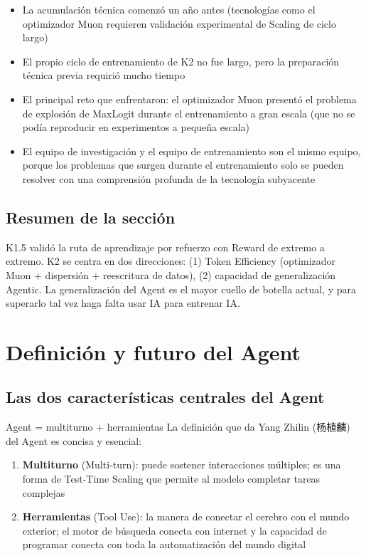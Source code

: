 \documentclass[a4paper]{article}
\begin{document}
\begin{itemize}
    \item La acumulación técnica comenzó un año antes (tecnologías como el optimizador Muon requieren validación experimental de Scaling de ciclo largo)
    \item El propio ciclo de entrenamiento de K2 no fue largo, pero la preparación técnica previa requirió mucho tiempo
    \item El principal reto que enfrentaron: el optimizador Muon presentó el problema de explosión de MaxLogit durante el entrenamiento a gran escala (que no se podía reproducir en experimentos a pequeña escala)
    \item El equipo de investigación y el equipo de entrenamiento son el mismo equipo, porque los problemas que surgen durante el entrenamiento solo se pueden resolver con una comprensión profunda de la tecnología subyacente
\end{itemize}

\subsection{Resumen de la sección}

K1.5 validó la ruta de aprendizaje por refuerzo con Reward de extremo a extremo. K2 se centra en dos direcciones: (1) Token Efficiency (optimizador Muon + dispersión + reescritura de datos), (2) capacidad de generalización Agentic. La generalización del Agent es el mayor cuello de botella actual, y para superarlo tal vez haga falta usar IA para entrenar IA.

\section{Definición y futuro del Agent}

\subsection{Las dos características centrales del Agent}

\begin{importantbox}{Agent = multiturno + herramientas}
La definición que da Yang Zhilin (杨植麟) del Agent es concisa y esencial:
\begin{enumerate}
    \item \textbf{Multiturno} (Multi-turn): puede sostener interacciones múltiples; es una forma de Test-Time Scaling que permite al modelo completar tareas complejas
    \item \textbf{Herramientas} (Tool Use): la manera de conectar el cerebro con el mundo exterior; el motor de búsqueda conecta con internet y la capacidad de programar conecta con toda la automatización del mundo digital
\end{enumerate}
\end{importantbox}
\end{document}
